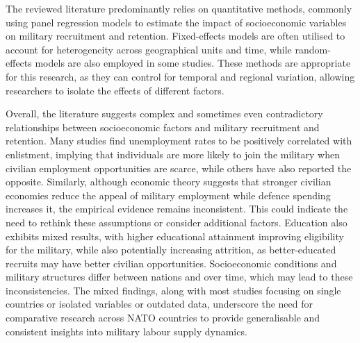 The reviewed literature predominantly relies on quantitative methods, commonly using panel regression models to estimate the impact of socioeconomic variables on military recruitment and retention. 
Fixed-effects models are often utilised to account for heterogeneity across geographical units and time, while random-effects models are also employed in some studies. 
These methods are appropriate for this research, as they can control for temporal and regional variation, allowing researchers to isolate the effects of different factors.

Overall, the literature suggests complex and sometimes even contradictory relationships between socioeconomic factors and military recruitment and retention. 
Many studies find unemployment rates to be positively correlated with enlistment, implying that individuals are more likely to join the military when civilian employment opportunities are scarce, while others have also reported the opposite. 
Similarly, although economic theory suggests that stronger civilian economies reduce the appeal of military employment while defence spending increases it, the empirical evidence remains inconsistent.
This could indicate the need to rethink these assumptions or consider additional factors. 
Education also exhibits mixed results, with higher educational attainment improving eligibility for the military, while also potentially increasing attrition, as better-educated recruits may have better civilian opportunities. 
Socioeconomic conditions and military structures differ between nations and over time, which may lead to these inconsistencies.
The mixed findings, along with most studies focusing on single countries or isolated variables or outdated data, underscore the need for comparative research across NATO countries to provide generalisable and consistent insights into military labour supply dynamics. 

